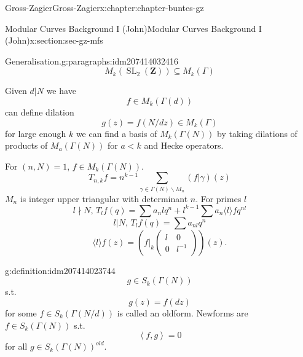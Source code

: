 \documentclass[oneside,10pt,]{book}
\numberwithin{equation}{section}
\newcommand{\inv}{^{-1}}
\newcommand{\pair}[2]{\left\langle #1, #2 \right\rangle}
\newcommand{\ZZ}{\mathbf{Z}}
\DeclareMathOperator{\SL}{SL}
\newcommand{\lt}{<}
\newcommand{\amp}{&}
\begin{document}
\begin{chapterptx}{Gross-Zagier}{}{Gross-Zagier}{}{}{x:chapter:chapter-buntes-gz}
\begin{sectionptx}{Modular Curves Background I (John)}{}{Modular Curves Background I (John)}{}{}{x:section:sec-gz-mfs}
\begin{paragraphs}{Generalisation.}{g:paragraphs:idm207414032416}
\begin{equation*}
\end{equation*}
%
\begin{equation*}
M_k(\SL_2(\ZZ)) \subseteq M_k(\Gamma )
\end{equation*}
%
\par
Given \(d|N\) we have%
\begin{equation*}
f \in M_k(\Gamma (d))
\end{equation*}
can define dilation%
\begin{equation*}
g(z) = f(N/d z) \in M_k(\Gamma )
\end{equation*}
for large enough \(k\) we can find a basis of \(M_k(\Gamma (N))\) by taking dilations of products of \(M_a(\Gamma (N))\) for \(a \lt k\) and Hecke operators.%
\par
For \((n,N) = 1\), \(f\in M_k(\Gamma (N))\).%
\begin{equation*}
T_{n,k} f = n^{k-1} \sum_{\gamma \in \Gamma (N) \backslash M_n} (f|\gamma )(z)
\end{equation*}
\(M_n\) is integer upper triangular with determinant \(n\). For primes \(l\)%
\begin{equation*}
l\nmid N,\, T_l f(q) = \sum a_n l q^n + l^{k-1} \sum a_n \langle l \rangle f q^{nl}
\end{equation*}
%
\begin{equation*}
l | N,\, T_lf(q) = \sum a_{nl} q^n
\end{equation*}
%
\begin{equation*}
\langle l \rangle f(z) = \left(f|_k \begin{pmatrix} l \amp 0 \\ 0 \amp l\inv \end{pmatrix}\right) (z)\text{.}
\end{equation*}
%
\begin{definition}{}{g:definition:idm207414023744}%
%
\begin{equation*}
g \in S_k(\Gamma (N))
\end{equation*}
s.t.%
\begin{equation*}
g(z) = f(d z)
\end{equation*}
for some \(f \in S_k(\Gamma (N/d))\) is called an oldform. Newforms are \(f\in S_k(\Gamma (N))\) s.t.%
\begin{equation*}
\pair fg = 0
\end{equation*}
for all \(g\in S_k(\Gamma (N))^{old}\).%
\end{definition}
\end{paragraphs}%
\end{sectionptx}

\end{chapterptx}
\end{document}
